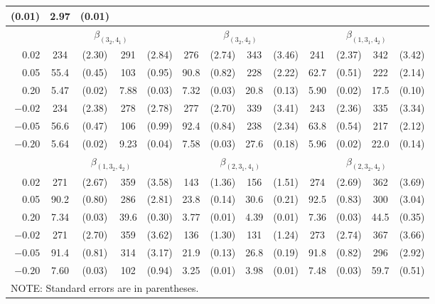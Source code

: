 \begin{table}[htp]
\begin{tabular}{r|cccc|cccc|cccc}
(0.01) & 2.97 & (0.01)
\\\hline
& \multicolumn{4}{c|}{$\beta_{(3_2,4_1)}$} &
\multicolumn{4}{c|}{$\beta_{(3_2,4_2)}$} & \multicolumn{4}{c}{$\beta_{(1,3_1,4_2)}$}
\\\hline
0.02 & 234 & (2.30) & 291 & (2.84) & 276 & (2.74) & 343 & (3.46) & 241 & (2.37) &
342 & (3.42)
\\
0.05 & 55.4 & (0.45) & 103 & (0.95) & 90.8 & (0.82) & 228 & (2.22) & 62.7 & (0.51) &
222 & (2.14)
\\
0.20 & 5.47 & (0.02) & 7.88 & (0.03) & 7.32 & (0.03) & 20.8 & (0.13) & 5.90 & (0.02)
& 17.5 & (0.10)
\\
$-0.02$ & 234 & (2.38) & 278 & (2.78) & 277 & (2.70) & 339 & (3.41) & 243 & (2.36) &
335 & (3.34)
\\
$-0.05$ & 56.6 & (0.47) & 106 & (0.99) & 92.4 & (0.84) & 238 & (2.34) & 63.8 &
(0.54) & 217 & (2.12)
\\
$-0.20$ & 5.64 & (0.02) & 9.23 & (0.04) & 7.58 & (0.03) & 27.6 & (0.18) & 5.96 &
(0.02) & 22.0 & (0.14)
\\\hline
& \multicolumn{4}{c|}{$\beta_{(1,3_2,4_2)}$} &
\multicolumn{4}{c|}{$\beta_{(2,3_1,4_1)}$} &
\multicolumn{4}{c}{$\beta_{(2,3_2,4_2)}$}
\\\hline
0.02 & 271 & (2.67) & 359 & (3.58) & 143 & (1.36) & 156 & (1.51) & 274 & (2.69) &
362 & (3.69)
\\
0.05 & 90.2 & (0.80) & 286 & (2.81) & 23.8 & (0.14) & 30.6 & (0.21) & 92.5 & (0.83)
& 300 & (3.04)
\\
0.20 & 7.34 & (0.03) & 39.6 & (0.30) & 3.77 & (0.01) & 4.39 & (0.01) & 7.36 & (0.03)
& 44.5 & (0.35)
\\
$-0.02$ & 271 & (2.70) & 359 & (3.62) & 136 & (1.30) & 131 & (1.24) & 273 & (2.74) &
367 & (3.66)
\\
$-0.05$ & 91.4 & (0.81) & 314 & (3.17) & 21.9 & (0.13) & 26.8 & (0.19) & 91.8 &
(0.82) & 296 & (2.92)
\\
$-0.20$ & 7.60 & (0.03) & 102 & (0.94) & 3.25 & (0.01) & 3.98 & (0.01) & 7.48 &
(0.03) & 59.7 & (0.51)
\\\hline
\multicolumn{13}{l}{NOTE: Standard errors are in parentheses.}
\end{tabular}\vspace{-0.1cm}
\end{table}


